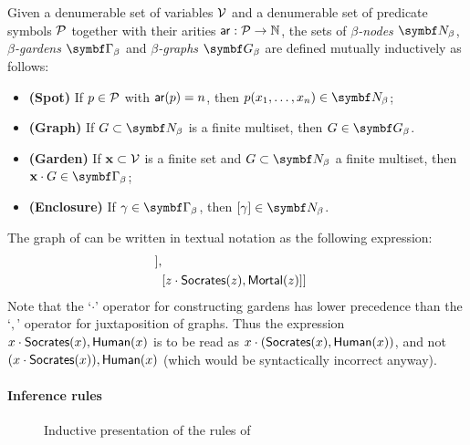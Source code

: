 \begin{definition} 
  
  Given a denumerable set of variables $\mathcal{V}$ and a denumerable set of
  predicate symbols $\mathcal{P}$ together with their arities $\mathsf{ar} : \mathcal{P} \to
  \mathbb{N}$, the sets of \emph{$\beta$-nodes} $\bnodes$, \emph{$\beta$-gardens}
  $\bgardens$ and \emph{$\beta$-graphs} $\bgraphs$ are defined mutually
  inductively as follows:
  \begin{itemize}
    \item \textbf{(Spot)} If $p \in \mathcal{P}$ with $\mathsf{ar}(p) = n$, then $p(x_1,
    \ldots, x_n) \in \bnodes$;
    \item \textbf{(Graph)} If $G \subset \bnodes$ is a finite multiset, then $G
    \in \bgraphs$.
    \item \textbf{(Garden)} If $\mathbf{x} \subset \mathcal{V}$ is a finite set and $G
    \subset \bnodes$ a finite multiset, then $\garden{\bx}{G} \in
    \bgardens$;
    \item \textbf{(Enclosure)} If $\gamma \in \bgardens$, then $[\gamma] \in \bnodes$.
  \end{itemize}
\end{definition}

\begin{example}
  The graph of  can be written in textual
  notation as the following expression:
  \begin{align*}
    [&x \cdot \socrates(x),\human(x), \\
     &[y \cdot \human(y),[{} \cdot \mortal(y)]], \\
     &[z \cdot \socrates(z),\mortal(z)]]
  \end{align*}
  Note that the `$\cdot$' operator for constructing gardens has lower precedence
  than the `$,$' operator for juxtaposition of graphs. Thus the expression $x
  \cdot \mbox{\textsf{Socrates}}(x),\mbox{\textsf{Human}}(x)$ is to be read as $x \cdot
  (\mbox{\textsf{Socrates}}(x),\mbox{\textsf{Human}}(x))$, and not $(x \cdot \mbox{\textsf{Socrates}}(x)),\mbox{\textsf{Human}}(x)$ (which
  would be syntactically incorrect anyway).
\end{example}

\paragraph{Inference rules}

\begin{figure}
  
  \caption{Inductive presentation of the rules of }
\end{figure}

